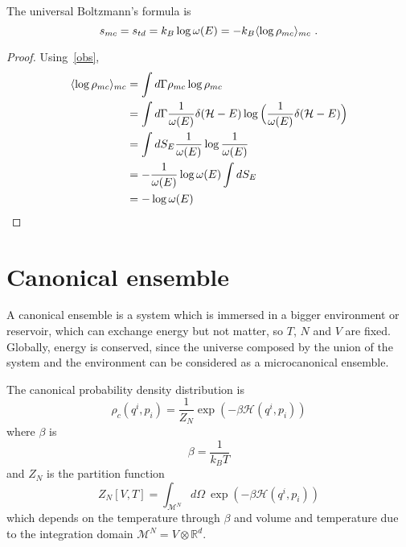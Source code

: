     The universal Boltzmann's formula is 
    \begin{equation}\label{unboltz}
        s_{mc} = s_{td} = k_B \log \omega(E) = - k_B \langle\log \rho_{mc}\rangle_{mc} ~.
    \end{equation}

    \begin{proof}
        
    Using~\eqref{obs}, 
    \begin{equation*}
    \begin{aligned}
        \langle\log \rho_{mc}\rangle_{mc} & = \int d\Gamma \rho_{mc} \log \rho_{mc} \\ & = \int d\Gamma \frac{1}{\omega(E)} \delta (\mathcal H - E) \log \Big ( \frac{1}{\omega(E)} \delta (\mathcal H - E) \Big) \\ & = \int dS_E \frac{1}{\omega(E)} \log \frac{1}{\omega(E)} \\ & = - \frac{1}{\omega(E)} \log \omega(E) \int dS_E \\ & = - \log \omega (E)
    \end{aligned}
    \end{equation*}
    \end{proof}

\chapter{Canonical ensemble}

    A canonical ensemble is a system which is immersed in a bigger environment or reservoir, which can exchange energy but not matter, so $T$, $N$ and $V$ are fixed. Globally, energy is conserved, since the universe composed by the union of the system and the environment can be considered as a microcanonical ensemble. 

    The canonical probability density distribution is 
    \begin{equation}\label{candist}
        \rho_c (q^i, p_i) = \frac{1}{Z_N} \exp (-\beta \mathcal H(q^i, p_i))
    \end{equation}
    where $\beta$ is 
    \begin{equation*}
        \beta = \frac{1}{k_B T}
    \end{equation*}
    and $Z_N$ is the partition function 
    \begin{equation}\label{zn}
        Z_N[V, T] = \int_{\mathcal M^N} d\Omega ~\exp (-\beta \mathcal H(q^i, p_i))
    \end{equation}
    which depends on the temperature through $\beta$ and volume and temperature due to the integration domain $\mathcal M^N = V \otimes \mathbb R^d$.

